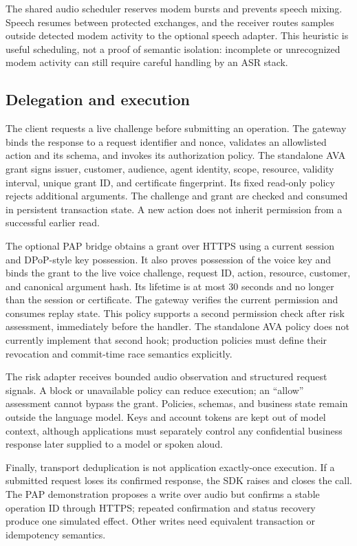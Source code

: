 The shared audio scheduler reserves modem bursts and prevents speech mixing.
Speech resumes between protected exchanges, and the receiver routes samples
outside detected modem activity to the optional speech adapter. This heuristic
is useful scheduling, not a proof of semantic isolation: incomplete or
unrecognized modem activity can still require careful handling by an ASR stack.

\subsection{Delegation and execution}
The client requests a live challenge before submitting an operation. The
gateway binds the response to a request identifier and nonce, validates an
allowlisted action and its schema, and invokes its authorization policy.
The standalone AVA grant signs issuer, customer, audience, agent identity,
scope, resource, validity interval, unique grant ID, and certificate fingerprint.
Its fixed read-only policy rejects additional arguments. The challenge and
grant are checked and consumed in persistent transaction state. A new action
does not inherit permission from a successful earlier read.

The optional PAP bridge obtains a grant over HTTPS using a current session and
DPoP-style key possession. It also proves possession of the voice key and binds
the grant to the live voice challenge, request ID, action, resource, customer,
and canonical argument hash. Its lifetime is at most 30 seconds and no longer
than the session or certificate. The gateway verifies the current permission
and consumes replay state. This policy supports a second permission check
after risk assessment, immediately before the handler. The standalone AVA
policy does not currently implement that second hook; production policies
must define their revocation and commit-time race semantics explicitly.

The risk adapter receives bounded audio observation and structured request
signals. A block or unavailable policy can reduce execution; an ``allow''
assessment cannot bypass the grant. Policies, schemas, and business state
remain outside the language model. Keys and account tokens are kept out of
model context, although applications must separately control any confidential
business response later supplied to a model or spoken aloud.

Finally, transport deduplication is not application exactly-once execution.
If a submitted request loses its confirmed response, the SDK raises
 and closes the call. The PAP demonstration proposes
a write over audio but confirms a stable operation ID through HTTPS; repeated
confirmation and status recovery produce one simulated effect. Other writes
need equivalent transaction or idempotency semantics.

